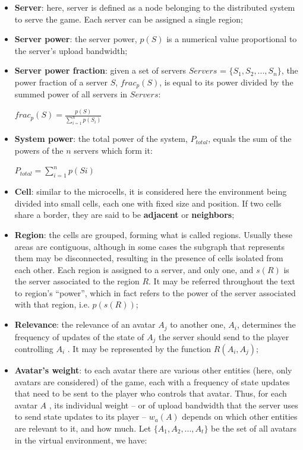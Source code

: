 \begin{itemize}
	\item \textbf{Server}: here, server is defined as a node belonging to the distributed system to serve the game. Each server can be assigned a single region;
	\item \textbf{Server power}: the server power, $p(S)$ is a numerical value proportional to the server's upload bandwidth;
	\item \textbf{Server power fraction}: given a set of servers $Servers$ = $\{S_1, S_2, ..., S_n\}$, the power fraction of a server $S$, $frac_p(S)$, is equal to its power divided by the summed power of all servers in $Servers$:
	
		\begin{center}
			$frac_p(S) = \frac{\displaystyle p(S)}{\displaystyle\sum_{i=1}^{n} p(S_i)}$
		\end{center}
		
	\item \textbf{System power}: the total power of the system, $P_{total}$, equals the sum of the powers of the $n$ servers which form it:
	
		\begin{center}
			$\displaystyle P_{total} = \sum_{i=1}^{n} p(Si)$
		\end{center}
	
	\item \textbf{Cell}: similar to the microcells, it is considered here the environment being divided into small cells, each one with fixed size and position. If two cells share a border, they are said to be \textbf{adjacent} or \textbf{neighbors};
	\item \textbf{Region}: the cells are grouped, forming what is called regions. Usually these areas are contiguous, although in some cases the subgraph that represents them may be disconnected, resulting in the presence of cells isolated from each other. Each region is assigned to a server, and only one, and $s(R)$ is the server associated to the region $R$. It may be referred throughout the text to region's ``power'', which in fact refers to the power of the server associated with that region, i.e. $p(s(R))$;
	\item \textbf{Relevance}: the relevance of an avatar $A_j$ to another one, $A_i$, determines the frequency of updates of the state of $A_j$ the server should send to the player controlling $A_i$ \cite{bezerra2008a3}. It may be represented by the function $R(A_i,A_j)$;
	\item \textbf{Avatar's weight}: to each avatar there are various other entities (here, only avatars are considered) of the game, each with a frequency of state updates that need to be sent to the player who controls that avatar. Thus, for each avatar $A$ , its individual weight -- or of upload bandwidth that the server uses to send state updates to its player -- $w_a(A)$ depends on which other entities are relevant to it, and how much. 
	Let $\{A_1, A_2, ..., A_t\}$ be the set of all avatars in the virtual environment, we have:
	

\end{itemize}
